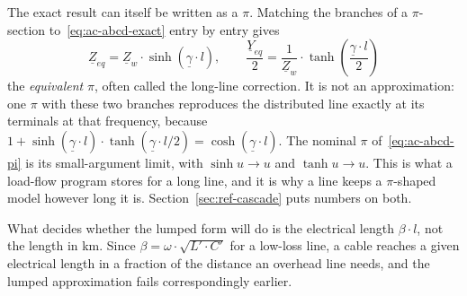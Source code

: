 The exact result can itself be written as a $\pi$. Matching the branches of a
$\pi$-section to~\eqref{eq:ac-abcd-exact} entry by entry gives
\begin{equation}
  \underline{Z}_{eq} = \underline{Z}_w \cdot
      \sinh\left(\underline{\gamma} \cdot l\right),
  \qquad
  \frac{\underline{Y}_{eq}}{2} = \frac{1}{\underline{Z}_w} \cdot
      \tanh\left(\frac{\underline{\gamma} \cdot l}{2}\right)
  \label{eq:ac-equivalent-pi}
\end{equation}
the \emph{equivalent} $\pi$, often called the long-line correction. It is not
an approximation: one $\pi$ with these two branches reproduces the
distributed line exactly at its terminals at that frequency, because
$1 + \sinh\left(\underline{\gamma} \cdot l\right) \cdot
\tanh\left(\underline{\gamma} \cdot l / 2\right) =
\cosh\left(\underline{\gamma} \cdot l\right)$. The nominal $\pi$
of~\eqref{eq:ac-abcd-pi} is its small-argument limit, with
$\sinh u \to u$ and $\tanh u \to u$. This is what a load-flow program
stores for a long line, and it is why a line keeps a $\pi$-shaped model
however long it is. Section~\ref{sec:ref-cascade} puts numbers on both.

What decides whether the lumped form will do is the electrical length
$\beta \cdot l$, not the length in km. Since $\beta = \omega \cdot
\sqrt{L' \cdot C'}$ for a low-loss line, a cable reaches a given electrical
length in a fraction of the distance an overhead line needs, and the lumped
approximation fails correspondingly earlier.

\FloatBarrier
